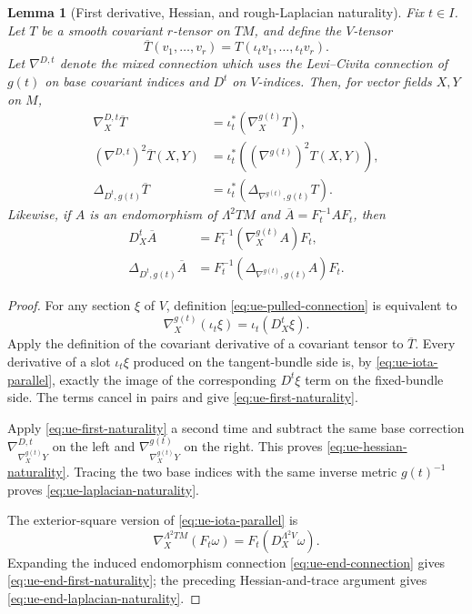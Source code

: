 \documentclass[10pt]{coll-l}
\newtheorem{lemma}[theorem]{Lemma}
\theoremstyle{definition}
\theoremstyle{remark}
\numberwithin{section}{chapter}
\numberwithin{equation}{chapter}
\begin{document}
\begin{lemma}[First derivative, Hessian, and rough-Laplacian naturality]
\label{lem:ue-spatial-naturality}
Fix $t\in I$.  Let $T$ be a smooth covariant $r$-tensor on $TM$, and define
the $V$-tensor
\[
 \overline T(v_1,\ldots,v_r)
    =T(\iota_tv_1,\ldots,\iota_tv_r).
\]
Let $\nabla^{D,t}$ denote the mixed connection which uses the
Levi--Civita connection of $g(t)$ on base covariant indices and $D^t$ on
$V$-indices.  Then, for vector fields $X,Y$ on $M$,
\begin{align}
 \nabla_X^{D,t}\overline T
   &=\iota_t^*(\nabla_X^{g(t)}T),                         \label{eq:ue-first-naturality}\\
 (\nabla^{D,t})^2\overline T(X,Y)
   &=\iota_t^*\!\left((\nabla^{g(t)})^2T(X,Y)\right),   \label{eq:ue-hessian-naturality}\\
 \Delta_{D^t,g(t)}\overline T
   &=\iota_t^*(\Delta_{\nabla^{g(t)},g(t)}T).             \label{eq:ue-laplacian-naturality}
\end{align}
Likewise, if $A$ is an endomorphism of $\Lambda^2TM$ and
$\overline A=F_t^{-1}AF_t$, then
\begin{align}
 D_X^t\overline A
   &=F_t^{-1}(\nabla_X^{g(t)}A)F_t,                       \label{eq:ue-end-first-naturality}\\
 \Delta_{D^t,g(t)}\overline A
   &=F_t^{-1}(\Delta_{\nabla^{g(t)},g(t)}A)F_t.           \label{eq:ue-end-laplacian-naturality}
\end{align}
\end{lemma}

\begin{proof}
For any section $\xi$ of $V$, definition
\eqref{eq:ue-pulled-connection} is equivalent to
\begin{equation}
       \nabla_X^{g(t)}(\iota_t\xi)=\iota_t(D_X^t\xi).    \label{eq:ue-iota-parallel}
\end{equation}
Apply the definition of the covariant derivative of a covariant tensor to
$\overline T$.  Every derivative of a slot $\iota_t\xi$ produced on the
tangent-bundle side is, by \eqref{eq:ue-iota-parallel}, exactly the image
of the corresponding $D^t\xi$ term on the fixed-bundle side.  The terms
cancel in pairs and give \eqref{eq:ue-first-naturality}.

Apply \eqref{eq:ue-first-naturality} a second time and subtract the same
base correction
$\nabla^{D,t}_{\nabla_X^{g(t)}Y}$ on the left and
$\nabla^{g(t)}_{\nabla_X^{g(t)}Y}$ on the right.  This proves
\eqref{eq:ue-hessian-naturality}.  Tracing the two base indices with the
same inverse metric $g(t)^{-1}$ proves
\eqref{eq:ue-laplacian-naturality}.

The exterior-square version of \eqref{eq:ue-iota-parallel} is
\[
 \nabla_X^{\Lambda^2TM}(F_t\omega)
       =F_t(D_X^{\Lambda^2V}\omega).
\]
Expanding the induced endomorphism connection
\eqref{eq:ue-end-connection} gives
\eqref{eq:ue-end-first-naturality}; the preceding Hessian-and-trace
argument gives \eqref{eq:ue-end-laplacian-naturality}.
\end{proof}
\end{document}
